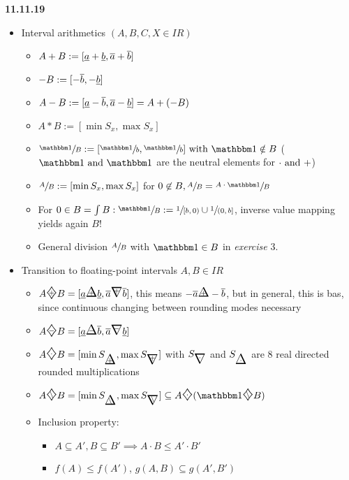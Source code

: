 \textbf{11.11.19}
\begin{itemize}
	\item Interval arithmetics $(A,B,C,X\in IR)$
	\begin{itemize}
		\item $A+B:=[\underline{a}+\underline{b},\overline{a}+\overline{b}]$
		\item $-B:=[-\overline{b},-\underline{b}]$
		\item $A-B:=[\underline{a}-\overline{b},\overline{a}-\underline{b}]=A+(-B)$
		\item $A*B:=[\min S_x,\max S_x]$
		\item $\sfrac{\one}{B}:=[\sfrac{\one}{b},\sfrac{\one}{b}] \with \zero\notin B$ ($\one \nd \zero$ are the neutral elements for $\cdot \text{ and } +$)
		\item $\sfrac{A}{B}:=[\min S_x, \max S_x]$ for $0\not \in B, \sfrac{A}{B}=\sfrac{A \cdot \one}{B}$
		\item For $0\in B=\int B: \sfrac{\one}{B}:=\sfrac{1}{[b,0)}\cup \sfrac{1}{(0,b]}$, inverse value mapping yields again $B$!
		\item General division $\sfrac{A}{B}$ with $\zero\in B$ in \emph{exercise} 3.
	\end{itemize}
	\item Transition to floating-point intervals $A,B \in IR$
	\begin{itemize}
		\item $A\rndintervalin{+}B=[\minval{a} \rndupin{+} \minval{b},\maxval{a}\rnddownin{+} \maxval{b}]$, this means $- \maxval{a} \rndupin{+} - \maxval{b}$, but in general, this is bas, since continuous changing between rounding modes necessary
		\item $A\rndintervalin{-}B=[\minval{a}\rndupin{-} \maxval{b},\maxval{a}\rnddownin{-} \minval{b}]$
		\item $A\rndintervalin{\cdot}B=[\min S_{\rndupin{+}}, \max S_{\rnddownin{+}}]$ with $S_{\rnddownin{\cdot}}$ and $S_{\rndupin{\cdot}}$ are 8 real directed rounded multiplications
		\item $A\rndintervalin{\setminus}B=[\min S_{\rndupin{\setminus}}, \max S_{\rnddownin{\setminus}}]\subseteq A\rndintervalin{\cdot}(\one \rndintervalin{\setminus}B)$
		\item Inclusion property:
		\begin{itemize}
			\item $A\subseteq A', B\subseteq B' \implies A\cdot B\le A' \cdot B'$
			\item $f(A)\le f(A')$, $g(A,B)\subseteq g(A', B')$
		\end{itemize}

\end{itemize}
\end{itemize}
